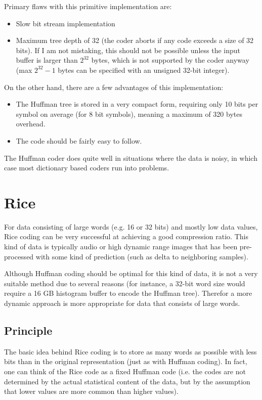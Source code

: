 \documentclass[a4paper,11pt,oneside]{report}
\begin{document}
Primary flaws with this primitive implementation are:
\begin{itemize}
\item Slow bit stream implementation
\item Maximum tree depth of 32 (the coder aborts if any code exceeds a
      size of 32 bits). If I am not mistaking, this should not be possible
      unless the input buffer is larger than $2^{32}$ bytes, which is not
      supported by the coder anyway (max $2^{32}-1$ bytes can be specified with
      an unsigned 32-bit integer).
\end{itemize}

On the other hand, there are a few advantages of this implementation:
\begin{itemize}
\item The Huffman tree is stored in a very compact form, requiring only
      10 bits per symbol on average (for 8 bit symbols), meaning a maximum
      of 320 bytes overhead.
\item The code should be fairly easy to follow.
\end{itemize}

The Huffman coder does quite well in situations where the data is noisy,
in which case most dictionary based coders run into problems.


\section{Rice}
For data consisting of large words (e.g. 16 or 32 bits) and mostly low
data values, Rice coding can be very successful at achieving a good
compression ratio. This kind of data is typically audio or high dynamic
range images that has been pre-processed with some kind of prediction
(such as delta to neighboring samples).

Although Huffman coding should be optimal for this kind of data, it is not
a very suitable method due to several reasons (for instance, a 32-bit
word size would require a 16 GB histogram buffer to encode the Huffman
tree). Therefor a more dynamic approach is more appropriate for data that
consists of large words.

\subsection{Principle}
The basic idea behind Rice coding is to store as many words as possible
with less bits than in the original representation (just as with Huffman
coding). In fact, one can think of the Rice code as a fixed Huffman code
(i.e. the codes are not determined by the actual statistical content of
the data, but by the assumption that lower values are more common than
higher values).
\end{document}
